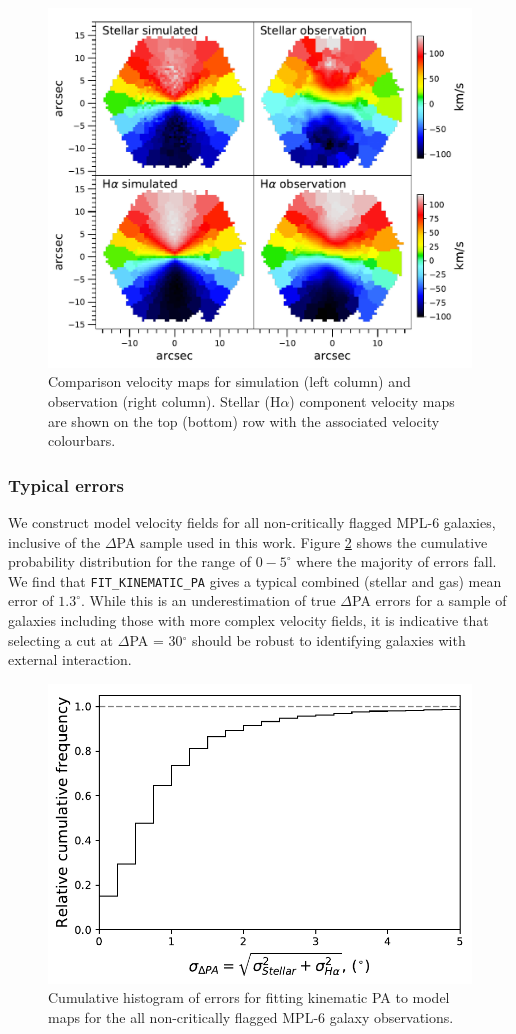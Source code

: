 \begin{figure}
    \centering
	\includegraphics[width=0.7\linewidth]{thesis/latex/misalignment_MaNGA/obs_sim_IFU.pdf}
    \caption[Comparison velocity maps for simulation (left column) and observation (right column).]{Comparison velocity maps for simulation (left column) and observation (right column). Stellar (H$\alpha$) component velocity maps are shown on the top (bottom) row with the associated velocity colourbars.}
    \label{fig:sim_ifu}
\end{figure}

\subsubsection{Typical errors}
We construct model velocity fields for all non-critically flagged MPL-6 galaxies, inclusive of the $\Delta$PA sample used in this work. Figure \ref{fig:model_errors} shows the cumulative probability distribution for the range of $0-5^{\circ}$ where the majority of errors fall. We find that \texttt{FIT\_KINEMATIC\_PA} gives a typical combined (stellar and gas) mean error of $1.3^{\circ}$. While this is an underestimation of true $\Delta$PA errors for a sample of galaxies including those with more complex velocity fields, it is indicative that selecting a cut at $\Delta$PA = 30$^{\circ}$ should be robust to identifying galaxies with external interaction. 

\begin{figure}
    \centering
	\includegraphics[width=0.6\linewidth]{thesis/latex/misalignment_MaNGA/cumulative_model_errors.pdf}
    \caption{Cumulative histogram of errors for fitting kinematic PA to model maps for the all non-critically flagged MPL-6 galaxy observations.}
    \label{fig:model_errors}
\end{figure}

